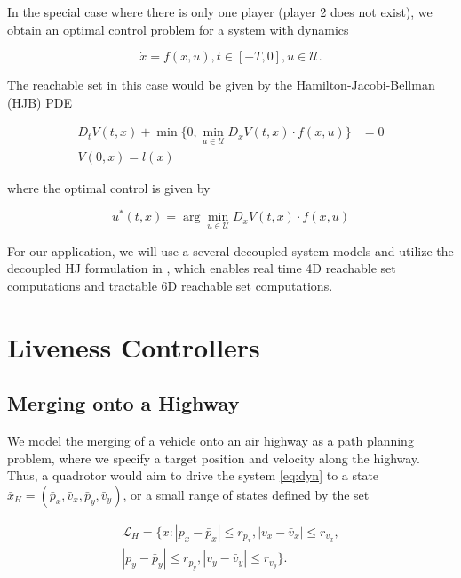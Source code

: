 In the special case where there is only one player (player 2 does not exist), we obtain an optimal control problem for a system with dynamics

\begin{equation} \label{eq:dyn_d}
\dot{x} = f(x, u), t\in [-T,0], u\in\mathcal U.
\end{equation}

The reachable set in this case would be given by the Hamilton-Jacobi-Bellman (HJB) PDE

\begin{equation} \label{eq:HJBPDE}
\begin{aligned}
D_t V(t,x) + \min \{0, \min_{u\in\mathcal{U}} D_x V(t,x) \cdot f(x,u)\} &= 0 \\
V(0,x) = l(x)&
\end{aligned}
\end{equation}

\noindent where the optimal control is given by

\begin{equation} \label{eq:HJB_ctrl_syn}
u^*(t,x) = \arg \min_{u\in\mathcal{U}} D_x V(t,x) \cdot f(x,u)
\end{equation}

For our application, we will use a several decoupled system models and utilize the decoupled HJ formulation in \cite{Chen15}, which enables real time 4D reachable set computations and tractable 6D reachable set computations.

\section{Liveness Controllers \label{sec:liveness}}
\subsection{Merging onto a Highway \label{subsec:highway_merge}}
We model the merging of a vehicle onto an air highway as a path planning problem, where we specify a target position and velocity along the highway. Thus, a quadrotor would aim to drive the system \eqref{eq:dyn} to a state $\bar{x}_H=(\bar{p}_x, \bar{v}_x, \bar{p}_y, \bar{v}_y)$, or a small range of states defined by the set

\begin{equation}
\begin{aligned}
\mathcal{L}_H = \{x: |p_x-\bar{p}_x|\le r_{p_x}, |v_x-\bar{v}_x|\le r_{v_x}, \\
|p_y - \bar{p}_y| \le r_{p_y}, |v_y - \bar{v}_y|\le r_{v_y} \}.
\end{aligned}
\end{equation}

